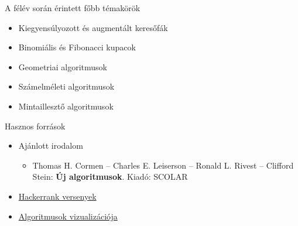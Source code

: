 \documentclass{beamer}
\begin{document}
\begin{frame}{A félév során érintett főbb témakörök}
	\begin{itemize}
		\item Kiegyensúlyozott és augmentált keresőfák
		\item Binomiális és Fibonacci kupacok
		\item Geometriai algoritmusok
		\item Számelméleti algoritmusok
		\item Mintaillesztő algoritmusok
	\end{itemize}
\end{frame}

\begin{frame}{Hasznos források}
	\begin{itemize}
		\item Ajánlott irodalom
		\begin{itemize}
			\item Thomas H. Cormen -- Charles E. Leiserson -- Ronald L. Rivest -- Clifford Stein: \textbf{Új algoritmusok}.  Kiadó: SCOLAR
		\end{itemize}
	\begin{figure}
	\end{figure}
	\end{itemize}
	\begin{itemize}
		\item \href{https://www.hackerrank.com/contests}{Hackerrank versenyek}
		\item \href{https://www.cs.usfca.edu/~galles/visualization/}{Algoritmusok vizualizációja}
	\end{itemize}
\end{frame}
\end{document}
